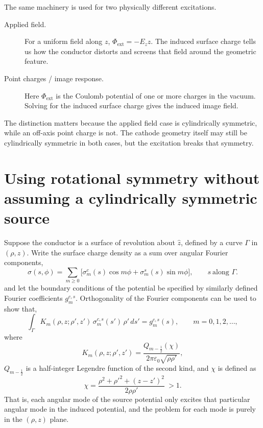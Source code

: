\documentclass[11pt]{article}
\begin{document}
The same machinery is used for two physically different excitations.

\begin{description}
\item[Applied field.] For a uniform field along $z$,
  $\Phi_{\mathrm{ext}}=-E_z z$.  The induced surface charge tells us how the
  conductor distorts and screens that field around the geometric feature.

\item[Point charges / image response.] Here $\Phi_{\mathrm{ext}}$ is the
  Coulomb potential of one or more charges in the vacuum.  Solving for the
  induced surface charge gives the induced image field.
\end{description}

The distinction matters because the applied field case is cylindrically symmetric, while an
off-axis point charge is not.  The cathode geometry itself may still be cylindrically symmetric in both cases, but the excitation breaks that symmetry.

\section{Using rotational symmetry without assuming a cylindrically symmetric source}

Suppose the conductor is a surface of revolution about $\hat z$, defined by a curve $\Gamma$ in $(\rho,z)$. Write the surface charge density as a sum over angular Fourier components,
\begin{equation}
  \sigma(s,\phi) = \sum_{m \ge 0}
  \Big[ \sigma^c_m(s)\cos m\phi + \sigma^s_m(s)\sin m\phi \Big],
  \qquad s \ \text{along } \Gamma.
\end{equation}
and let the boundary conditions of the potential be specified by similarly defined Fourier coefficients $g^{c,s}_m$. Orthogonality of the Fourier components can be used to show that,
\begin{equation}
  \int_\Gamma K_m(\rho,z;\rho',z')\,
  \sigma^{c,s}_m(s')\, \rho'\, ds'
  = g^{c,s}_m(s),
  \qquad m = 0,1,2,\dots,
  \label{eq:per-mode}
\end{equation}
where
\begin{equation}
  K_m(\rho,z;\rho',z')
  = \frac{Q_{m-\frac12}(\chi)}{2\pi \varepsilon_0 \sqrt{\rho\rho'}},
  \label{eq:ring-kernel}
\end{equation}
$Q_{m-\frac12}$ is a half-integer Legendre function of the second kind, and $\chi$ is defined as
\begin{equation}
  \chi = \frac{\rho^2 + \rho'^2 + (z-z')^2}{2\rho\rho'} \ > 1.
\end{equation}
That is, each angular mode of the source potential only excites that particular angular mode in the induced potential, and the problem for each mode is purely in the $(\rho,z)$ plane.
\end{document}
